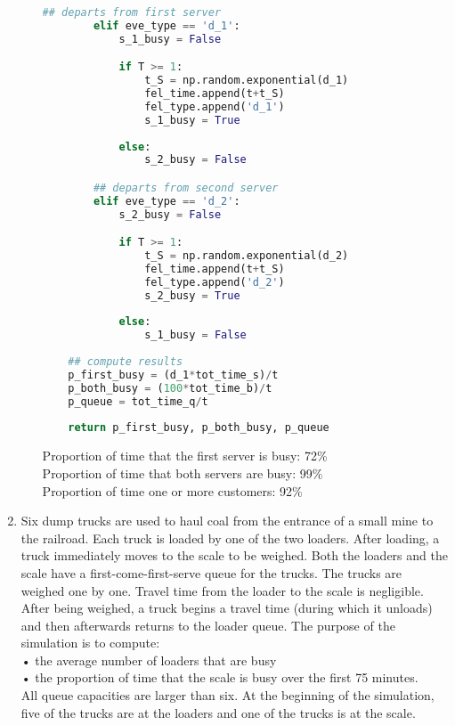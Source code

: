 \documentclass{article}
\begin{document}
\begin{enumerate}
\begin{enumerate}
\begin{lstlisting}[language=Python, title=Fig. Python 1(d)]
        ## departs from first server
        elif eve_type == 'd_1':
            s_1_busy = False

            if T >= 1:
                t_S = np.random.exponential(d_1)
                fel_time.append(t+t_S)
                fel_type.append('d_1')
                s_1_busy = True
            
            else:
                s_2_busy = False

        ## departs from second server
        elif eve_type == 'd_2':
            s_2_busy = False

            if T >= 1:
                t_S = np.random.exponential(d_2)
                fel_time.append(t+t_S)
                fel_type.append('d_2')
                s_2_busy = True
            
            else:
                s_1_busy = False
    
    ## compute results
    p_first_busy = (d_1*tot_time_s)/t
    p_both_busy = (100*tot_time_b)/t
    p_queue = tot_time_q/t
    
    return p_first_busy, p_both_busy, p_queue
\end{lstlisting}

    Proportion of time that the first server is busy: 72\% \\
    Proportion of time that both servers are busy: 99\% \\
    Proportion of time one or more customers: 92\% \\
    \end{enumerate}

    \item Six dump trucks are used to haul coal from the entrance of a small mine to the railroad. Each truck is loaded by one of the two loaders. After loading, a truck immediately moves to the scale to be weighed. Both the loaders and the scale have a first-come-first-serve queue for the trucks. The trucks are weighed one by one. Travel time from the loader to the scale is negligible. After being weighed, a truck begins a travel time (during which it unloads) and then afterwards returns to the loader queue. The purpose of the simulation is to compute:\\
    
    • the average number of loaders that are busy\\
    • the proportion of time that the scale is busy over the first 75 minutes.\\
    
    All queue capacities are larger than six. At the beginning of the simulation, five of the trucks are at the loaders and one of the trucks is at the scale.


\end{enumerate}
\end{document}
